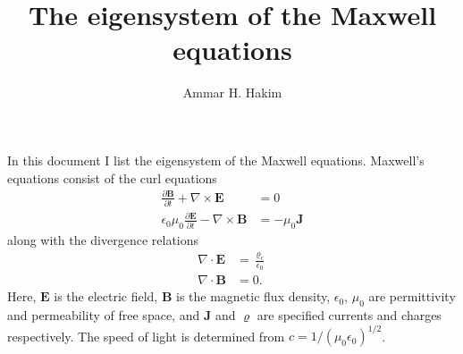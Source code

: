 \documentclass[11pt, reqno]{amsart}
\title[Maxwell Eigensystem]{The eigensystem of the Maxwell equations}%
\author{Ammar H. Hakim}%
\date{}
\newcommand{\mvec}[1]{\mathbf{#1}}
\theoremstyle{definition}
\begin{document}
\maketitle

In this document I list the eigensystem of the Maxwell
equations. Maxwell's equations consist of the curl equations
\begin{align}
  \frac{\partial \mvec{B}}{\partial t} + \nabla\times\mvec{E} &= 0 \\
  \epsilon_0\mu_0\frac{\partial \mvec{E}}{\partial t} -
  \nabla\times\mvec{B} &= -\mu_0\mvec{J}
\end{align}
along with the divergence relations
\begin{align}
  \nabla\cdot\mvec{E} &= \frac{\varrho_c}{\epsilon_0} \\
  \nabla\cdot\mvec{B} &= 0.
\end{align}
Here, $\mvec{E}$ is the electric field, $\mvec{B}$ is the magnetic
flux density, $\epsilon_0$, $\mu_0$ are permittivity and permeability
of free space, and $\mvec{J}$ and $\varrho$ are specified currents and
charges respectively. The speed of light is determined from
$c=1/(\mu_0\epsilon_0)^{1/2}$.
\end{document}
